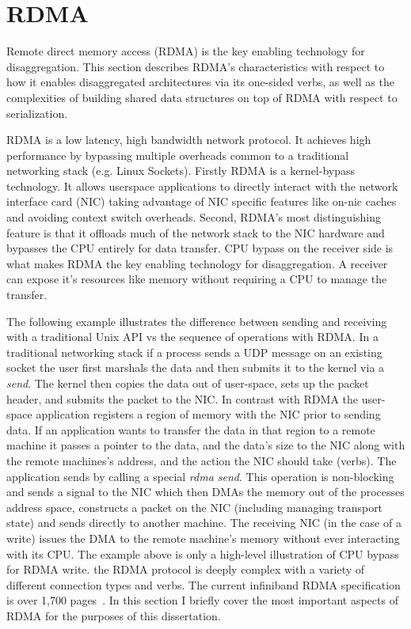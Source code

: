 \documentclass[12pt]{ucsddissertation}
\begin{document}
\section{RDMA}

Remote direct memory access (RDMA) is the key enabling technology for disaggregation. This section
describes RDMA's characteristics with respect to how it enables disaggregated architectures via its
one-sided verbs, as well as the complexities of building shared data structures on top of RDMA with
respect to serialization.

RDMA is a low latency, high bandwidth network protocol. It achieves high performance by bypassing
multiple overheads common to a traditional networking stack (e.g.  Linux Sockets). 
Firstly RDMA is a kernel-bypass technology. It allows userspace applications to directly interact
with the network interface card (NIC) taking advantage of NIC specific features like on-nic
caches~\cite{sherman} and avoiding context switch overheads.
Second, RDMA's most distinguishing feature is that it offloads much of the network stack to the NIC
hardware and bypasses the CPU entirely for data transfer. CPU bypass on the receiver side is what
makes RDMA the key enabling technology for disaggregation. A receiver can expose it's resources like
memory without requiring a CPU to manage the transfer.

The following example illustrates the difference between sending and receiving with a traditional
Unix API vs the sequence of operations with RDMA. In a traditional networking stack if a process
sends a UDP message on an existing socket the user first marshals the data and then submits it to
the kernel via a \textit{send}. The kernel then copies the data out of user-space, sets up the
packet header, and submits the packet to the NIC. 
In contrast with RDMA the user-space application registers a region of memory with the NIC prior to
sending data. If an application wants to transfer the data in that region to a remote machine it
passes a pointer to the data, and the data's size to the NIC along with the remote machines's
address, and the action the NIC should take (verbs). The application sends by calling a special
\textit{rdma send}. This operation is non-blocking and sends a signal to the NIC which then DMAs the
memory out of the processes address space, constructs a packet on the NIC (including managing
transport state) and sends directly to another machine. The receiving NIC (in the case of a write)
issues the DMA to the remote machine's memory without ever interacting with its CPU.  
The example above is only a high-level illustration of CPU bypass for RDMA write.  the RDMA protocol
is deeply complex with a variety of different connection types and verbs. The current infiniband
RDMA specification is over 1,700 pages~\cite{infiniband-spec}. In this section I briefly cover the
most important aspects of RDMA for the purposes of this dissertation.
\end{document}
